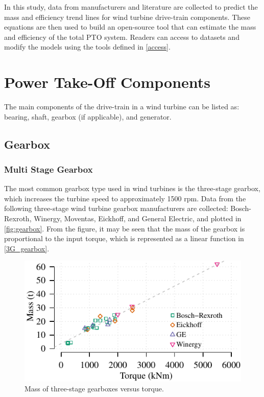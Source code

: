 \documentclass{article}\usepackage{graphicx, color}
\makeatletter
\def\maxwidth{ %
  \ifdim\Gin@nat@width>\linewidth
    \linewidth
  \else
    \Gin@nat@width
  \fi
}
\newenvironment{knitrout}{}{} %
\makeatother
\begin{document}
In this study, data from manufacturers and literature are collected to predict the  mass and efficiency trend lines for wind turbine drive-train components. These equations are then used to build an open-source tool that can estimate the mass and efficiency of the total PTO system. Readers can access to datasets and modify the models using the tools defined in \autoref{access}.

\section{Power Take-Off Components}

The main components of the drive-train in a wind turbine can be listed as: bearing, shaft, gearbox (if applicable), and generator. 

\subsection{Gearbox}

\subsubsection{Multi Stage Gearbox}

The most common gearbox type used in wind turbines is the three-stage gearbox, which increases the turbine speed to approximately 1500 rpm. 
Data from the following three-stage wind turbine gearbox manufacturers are collected: Bosch-Rexroth\cite{bosch}, Winergy\cite{winergy}, Moventas\cite{Moventas}, Eickhoff\cite{eickhoff}, and General Electric\cite{GE}, and plotted in \autoref{fig:gearbox}. From the figure, it may be seen that the mass of the gearbox is proportional to the input torque, which is represented as a linear function in \autoref{3G_gearbox}. 

\begin{knitrout}
\color{fgcolor}\begin{figure}[]

\includegraphics[width=\maxwidth]{figure/gearbox} \caption[Mass of three-stage gearboxes versus torque]{Mass of three-stage gearboxes versus torque.\label{fig:gearbox}}
\end{figure}


\end{knitrout}
\end{document}
